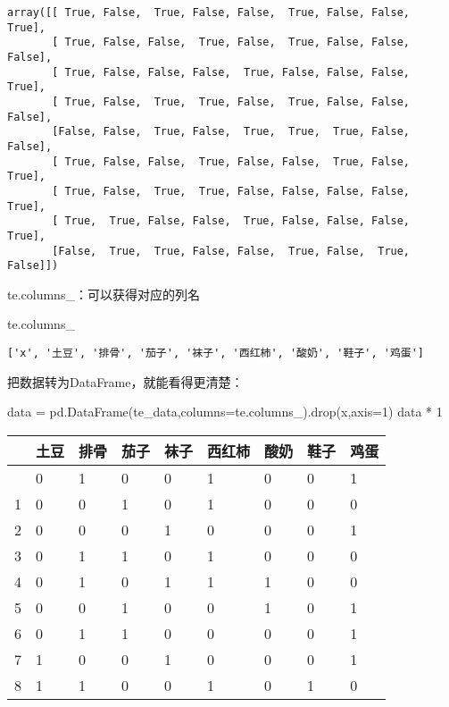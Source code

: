 \documentclass[
  letterpaper,
  DIV=11,
  numbers=noendperiod]{scrreprt}
\newenvironment{Shaded}{\begin{snugshade}}{\end{snugshade}}
\newcommand{\DecValTok}[1]{\textcolor[rgb]{0.68,0.00,0.00}{#1}}
\newcommand{\NormalTok}[1]{\textcolor[rgb]{0.00,0.23,0.31}{#1}}
\newcommand{\OperatorTok}[1]{\textcolor[rgb]{0.37,0.37,0.37}{#1}}
\newcommand{\StringTok}[1]{\textcolor[rgb]{0.13,0.47,0.30}{#1}}
\begin{document}
\begin{verbatim}
array([[ True, False,  True, False, False,  True, False, False,  True],
       [ True, False, False,  True, False,  True, False, False, False],
       [ True, False, False, False,  True, False, False, False,  True],
       [ True, False,  True,  True, False,  True, False, False, False],
       [False, False,  True, False,  True,  True,  True, False, False],
       [ True, False, False,  True, False, False,  True, False,  True],
       [ True, False,  True,  True, False, False, False, False,  True],
       [ True,  True, False, False,  True, False, False, False,  True],
       [False,  True,  True, False, False,  True, False,  True, False]])
\end{verbatim}

te.columns\_：可以获得对应的列名

\begin{Shaded}
\begin{Highlighting}[]
\NormalTok{te.columns\_}
\end{Highlighting}
\end{Shaded}

\begin{verbatim}
['x', '土豆', '排骨', '茄子', '袜子', '西红柿', '酸奶', '鞋子', '鸡蛋']
\end{verbatim}

把数据转为DataFrame，就能看得更清楚：

\begin{Shaded}
\begin{Highlighting}[]
\NormalTok{data }\OperatorTok{=}\NormalTok{ pd.DataFrame(te\_data,columns}\OperatorTok{=}\NormalTok{te.columns\_).drop(}\StringTok{\textquotesingle{}x\textquotesingle{}}\NormalTok{,axis}\OperatorTok{=}\DecValTok{1}\NormalTok{) }
\NormalTok{data }\OperatorTok{*} \DecValTok{1}
\end{Highlighting}
\end{Shaded}

\begin{longtable}[]{@{}lllllllll@{}}
\toprule\noalign{}
& 土豆 & 排骨 & 茄子 & 袜子 & 西红柿 & 酸奶 & 鞋子 & 鸡蛋 \\
\midrule\noalign{}
\endhead
\bottomrule\noalign{}
\endlastfoot
0 & 0 & 1 & 0 & 0 & 1 & 0 & 0 & 1 \\
1 & 0 & 0 & 1 & 0 & 1 & 0 & 0 & 0 \\
2 & 0 & 0 & 0 & 1 & 0 & 0 & 0 & 1 \\
3 & 0 & 1 & 1 & 0 & 1 & 0 & 0 & 0 \\
4 & 0 & 1 & 0 & 1 & 1 & 1 & 0 & 0 \\
5 & 0 & 0 & 1 & 0 & 0 & 1 & 0 & 1 \\
6 & 0 & 1 & 1 & 0 & 0 & 0 & 0 & 1 \\
7 & 1 & 0 & 0 & 1 & 0 & 0 & 0 & 1 \\
8 & 1 & 1 & 0 & 0 & 1 & 0 & 1 & 0 \\
\end{longtable}
\end{document}
